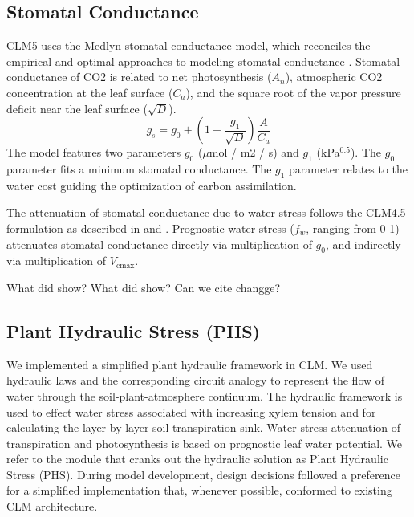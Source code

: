 \documentclass[draft,linenumbers]{agujournal}
\begin{document}
\subsection{Stomatal Conductance}
\label{sect:gs}
    CLM5 uses the Medlyn stomatal conductance model, which reconciles the empirical and optimal approaches to modeling 
    stomatal conductance \citep{medlyn2011}. 
    Stomatal conductance of CO2 is related to net photosynthesis ($A_n$), atmospheric CO2 concentration at the leaf surface 
    ($C_a$), and the square root of the vapor pressure deficit near the leaf surface ($\sqrt{D}$).
    \begin{equation}
    g_s=g_0+\left(1+\dfrac{g_1}{\sqrt{D}}\right)\dfrac{A}{C_a}
    \end{equation}
    The model features two parameters $g_0$ ($\mu$mol / m2 / s) and $g_1$ (kPa$^{0.5}$). The $g_0$ parameter fits a 
    minimum stomatal conductance. The $g_1$ parameter relates to the water cost guiding the optimization of carbon 
    assimilation.
    
    The attenuation of stomatal conductance due to water stress follows the CLM4.5 formulation as described in 
    \citet{oleson2013} and \citet{bonan2011}. Prognostic water stress ($f_w$, ranging from 0-1) attenuates stomatal 
    conductance directly via multiplication of $g_0$, and indirectly via multiplication of $V_{\text{cmax}}$. 
    
    What did \citet{zhou2014} show? What did \citet{manzoni2011} show? Can we cite changge?

\subsection{Plant Hydraulic Stress (PHS)}
  We implemented a simplified plant hydraulic framework in CLM. 
  We used hydraulic laws and the corresponding circuit analogy to represent the 
  flow of water through the soil-plant-atmosphere continuum. 
  The hydraulic framework is used to effect water stress associated with increasing xylem tension
  and for calculating the layer-by-layer soil transpiration sink. 
  Water stress attenuation of transpiration and photosynthesis is based on prognostic leaf water potential. 
  We refer to the module that cranks out the hydraulic solution as Plant Hydraulic Stress (PHS).
  During model development, design decisions followed a preference for a simplified implementation that,
  whenever possible, conformed to existing CLM architecture.
  
\end{document}
